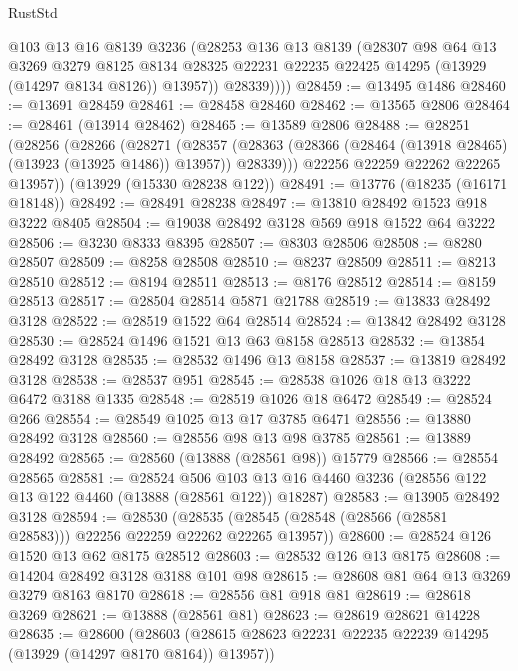 \begin{lexlean}{RustStd}
\begin{coremodule}
            @103
            @13
            @16
            @8139
            @3236
            (@28253
              @136
              @13
              @8139
              (@28307
                @98
                @64
                @13
                @3269
                @3279
                @8125
                @8134
                @28325
                @22231
                @22235
                @22425
                @14295
                (@13929 (@14297 @8134 @8126))
                @13957))
            @28339))))
@28459 := @13495 @1486
@28460 := @13691 @28459
@28461 := @28458 @28460
@28462 := @13565 @2806
@28464 := @28461 (@13914 @28462)
@28465 := @13589 @2806
@28488 := @28251
    (@28256
      (@28266
        (@28271
          (@28357 (@28363 (@28366 (@28464 (@13918 @28465) (@13923 (@13925 @1486)) @13957)) @28339)))
        @22256
        @22259
        @22262
        @22265
        @13957))
    (@13929 (@15330 @28238 @122))
@28491 := @13776 (@18235 (@16171 @18148))
@28492 := @28491 @28238
@28497 := @13810 @28492 @1523 @918 @3222 @8405
@28504 := @19038 @28492 @3128 @569 @918 @1522 @64 @3222
@28506 := @3230 @8333 @8395
@28507 := @8303 @28506
@28508 := @8280 @28507
@28509 := @8258 @28508
@28510 := @8237 @28509
@28511 := @8213 @28510
@28512 := @8194 @28511
@28513 := @8176 @28512
@28514 := @8159 @28513
@28517 := @28504 @28514 @5871 @21788
@28519 := @13833 @28492 @3128
@28522 := @28519 @1522 @64 @28514
@28524 := @13842 @28492 @3128
@28530 := @28524 @1496 @1521 @13 @63 @8158 @28513
@28532 := @13854 @28492 @3128
@28535 := @28532 @1496 @13 @8158
@28537 := @13819 @28492 @3128
@28538 := @28537 @951
@28545 := @28538 @1026 @18 @13 @3222 @6472 @3188 @1335
@28548 := @28519 @1026 @18 @6472
@28549 := @28524 @266
@28554 := @28549 @1025 @13 @17 @3785 @6471
@28556 := @13880 @28492 @3128
@28560 := @28556 @98 @13 @98 @3785
@28561 := @13889 @28492
@28565 := @28560 (@13888 (@28561 @98)) @15779
@28566 := @28554 @28565
@28581 := @28524
    @506
    @103
    @13
    @16
    @4460
    @3236
    (@28556 @122 @13 @122 @4460 (@13888 (@28561 @122)) @18287)
@28583 := @13905 @28492 @3128
@28594 := @28530
    (@28535 (@28545 (@28548 (@28566 (@28581 @28583))) @22256 @22259 @22262 @22265 @13957))
@28600 := @28524 @126 @1520 @13 @62 @8175 @28512
@28603 := @28532 @126 @13 @8175
@28608 := @14204 @28492 @3128 @3188 @101 @98
@28615 := @28608 @81 @64 @13 @3269 @3279 @8163 @8170
@28618 := @28556 @81 @918 @81
@28619 := @28618 @3269
@28621 := @13888 (@28561 @81)
@28623 := @28619 @28621 @14228
@28635 := @28600
    (@28603 (@28615 @28623 @22231 @22235 @22239 @14295 (@13929 (@14297 @8170 @8164)) @13957))

\end{coremodule}
\end{lexlean}
